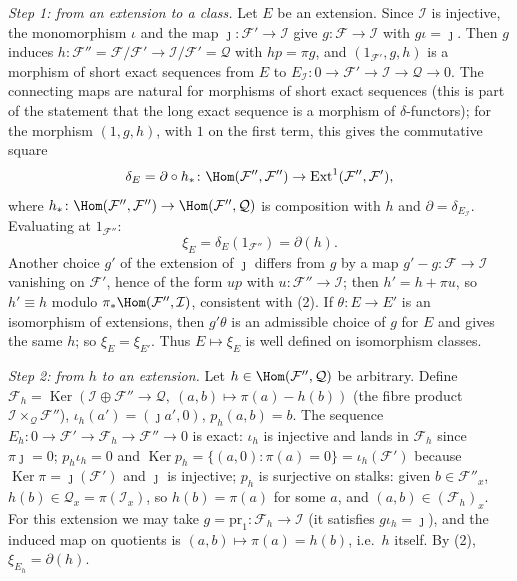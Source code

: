 \documentclass[11pt]{article}
\begin{document}
\emph{Step 1: from an extension to a class.} Let $E$ be an extension. Since $\mathcal I$ is injective, the monomorphism $\iota$ and the map $\jmath\colon\mathcal F'\to\mathcal I$ give $g\colon\mathcal F\to\mathcal I$ with $g\iota=\jmath$. Then $g$ induces $h\colon\mathcal F''=\mathcal F/\mathcal F'\to\mathcal I/\mathcal F'=\mathcal Q$ with $hp=\pi g$, and $(1_{\mathcal F'},g,h)$ is a morphism of short exact sequences from $E$ to $E_{\mathcal I}\colon0\to\mathcal F'\to\mathcal I\to\mathcal Q\to0$. The connecting maps are natural for morphisms of short exact sequences (this is part of the statement that the long exact sequence is a morphism of $\delta$-functors); for the morphism $(1,g,h)$, with $1$ on the first term, this gives the commutative square
\[
\delta_E=\partial\circ h_*\colon\Hom(\mathcal F'',\mathcal F'')\to\operatorname{Ext}^1(\mathcal F'',\mathcal F'),
\]
where $h_*\colon\Hom(\mathcal F'',\mathcal F'')\to\Hom(\mathcal F'',\mathcal Q)$ is composition with $h$ and $\partial=\delta_{E_{\mathcal I}}$. Evaluating at $1_{\mathcal F''}$:
\[
\xi_E=\delta_E(1_{\mathcal F''})=\partial(h).\tag{2}
\]
Another choice $g'$ of the extension of $\jmath$ differs from $g$ by a map $g'-g\colon\mathcal F\to\mathcal I$ vanishing on $\mathcal F'$, hence of the form $u p$ with $u\colon\mathcal F''\to\mathcal I$; then $h'=h+\pi u$, so $h'\equiv h$ modulo $\pi_*\Hom(\mathcal F'',\mathcal I)$, consistent with (2). If $\theta\colon E\to E'$ is an isomorphism of extensions, then $g'\theta$ is an admissible choice of $g$ for $E$ and gives the same $h$; so $\xi_E=\xi_{E'}$. Thus $E\mapsto\xi_E$ is well defined on isomorphism classes.

\emph{Step 2: from $h$ to an extension.} Let $h\in\Hom(\mathcal F'',\mathcal Q)$ be arbitrary. Define $\mathcal F_h=\operatorname{Ker}(\mathcal I\oplus\mathcal F''\to\mathcal Q,\ (a,b)\mapsto\pi(a)-h(b))$ (the fibre product $\mathcal I\times_{\mathcal Q}\mathcal F''$), $\iota_h(a')=(\jmath a',0)$, $p_h(a,b)=b$. The sequence $E_h\colon0\to\mathcal F'\to\mathcal F_h\to\mathcal F''\to0$ is exact: $\iota_h$ is injective and lands in $\mathcal F_h$ since $\pi\jmath=0$; $p_h\iota_h=0$ and $\operatorname{Ker}p_h=\{(a,0):\pi(a)=0\}=\iota_h(\mathcal F')$ because $\operatorname{Ker}\pi=\jmath(\mathcal F')$ and $\jmath$ is injective; $p_h$ is surjective on stalks: given $b\in\mathcal F''_x$, $h(b)\in\mathcal Q_x=\pi(\mathcal I_x)$, so $h(b)=\pi(a)$ for some $a$, and $(a,b)\in(\mathcal F_h)_x$. For this extension we may take $g=\mathrm{pr}_1\colon\mathcal F_h\to\mathcal I$ (it satisfies $g\iota_h=\jmath$), and the induced map on quotients is $(a,b)\mapsto\pi(a)=h(b)$, i.e.\ $h$ itself. By (2), $\xi_{E_h}=\partial(h)$.
\end{document}
